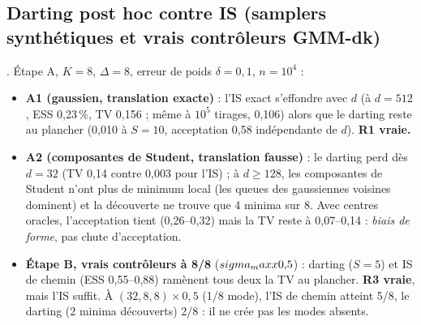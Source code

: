 \subsection{Darting post hoc contre IS (samplers synthétiques et vrais contrôleurs GMM-dk)}
. Étape A, $K=8$, $\Delta=8$, erreur de poids $\delta=0{,}1$, $n=10^4$ :
\begin{itemize}
  \item \textbf{A1 (gaussien, translation exacte)} : l'IS exact s'effondre avec $d$ (à $d=512$, ESS 0,23\,\%, TV 0,156 ; même à $10^5$ tirages, 0,106) alors que le darting reste au plancher (0,010 à $S=10$, acceptation 0,58 indépendante de $d$). \textbf{R1 vraie.}
  \item \textbf{A2 (composantes de Student, translation fausse)} : le darting perd dès $d=32$ (TV 0,14 contre 0,003 pour l'IS) ; à $d\ge128$, les composantes de Student n'ont plus de minimum local (les queues des gaussiennes voisines dominent) et la découverte ne trouve que 4 minima sur 8. Avec centres oracles, l'acceptation tient (0,26--0,32) mais la TV reste à 0,07--0,14 : \emph{biais de forme}, pas chute d'acceptation.
  \item \textbf{Étape B, vrais contrôleurs à 8/8} ($sigma_maxx0{,}5$) : darting ($S=5$) et IS de chemin (ESS 0,55--0,88) ramènent tous deux la TV au plancher. \textbf{R3 vraie}, mais l'IS suffit. À $(32,8,8)\times0{,}5$ (1/8 mode), l'IS de chemin atteint 5/8, le darting (2 minima découverts) 2/8 : il ne crée pas les modes absents.
\end{itemize}


